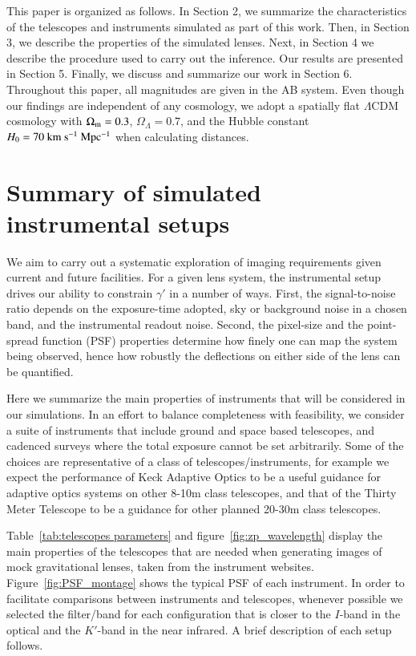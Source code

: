 \documentclass[a4paper,11pt]{article}
\begin{document}
This paper is organized as follows. In Section 2, we summarize the
characteristics of the telescopes and instruments simulated as part of
this work. Then, in Section 3, we describe the properties of the
simulated lenses. Next, in Section 4 we describe the procedure used to
carry out the inference.  Our results are presented in Section
5. Finally, we discuss and summarize our work in Section 6. Throughout
this paper, all magnitudes are given in the AB system. Even though our
findings are independent of any cosmology, we adopt a spatially flat
$\Lambda$CDM cosmology with $\Omega_{\rm{m}} = 0.3$, $\Omega_{\Lambda}
= 0.7$, and the Hubble constant $H_{0} = 70~\rm km~s^{-1}~Mpc^{-1}$
when calculating distances.

\section{Summary of simulated instrumental setups}

We aim to carry out a systematic exploration of imaging requirements
given current and future facilities. For a given lens system, the
instrumental setup drives our ability to constrain $\gamma'$ in a
number of ways. First, the signal-to-noise ratio depends on the
exposure-time adopted, sky or background noise in a chosen band, and
the instrumental readout noise. Second, the pixel-size and the
point-spread function (PSF) properties determine how finely one can
map the system being observed, hence how robustly the deflections on
either side of the lens can be quantified.
 
Here we summarize the main properties of instruments that will be
considered in our simulations. In an effort to balance completeness
with feasibility, we consider a suite of instruments that include
ground and space based telescopes, and cadenced surveys where the
total exposure cannot be set arbitrarily. Some of the choices are
representative of a class of telescopes/instruments, for example we
expect the performance of Keck Adaptive Optics to be a useful guidance
for adaptive optics systems on other 8-10m class telescopes, and that
of the Thirty Meter Telescope to be a guidance for other planned
20-30m class telescopes.

Table~\ref{tab:telescopes parameters} and
figure~\ref{fig:zp_wavelength} display the main properties of the
telescopes that are needed when generating images of mock
gravitational lenses, taken from the instrument
websites. Figure~\ref{fig:PSF_montage} shows the typical PSF of each
instrument. In order to facilitate comparisons between instruments and
telescopes, whenever possible we selected the filter/band for each
configuration that is closer to the $I$-band in the optical and the
$K'$-band in the near infrared. A brief description of each setup
follows.
\end{document}
